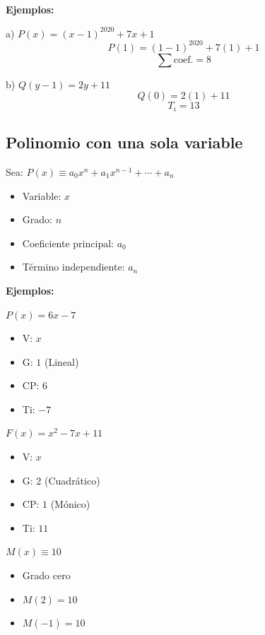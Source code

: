 \documentclass[11pt,a4paper]{article}
\begin{document}
\textbf{Ejemplos:}

\begin{minipage}[t]{0.485\textwidth}
a) $P(x) = (x-1)^{2020} + 7x + 1$
\[P(1) = (1-1)^{2020} + 7(1) + 1\]
\[\textstyle\sum \text{coef.} = 8\]
\end{minipage}\hfill
\begin{minipage}[t]{0.485\textwidth}
b) $Q(y-1) = 2y + 11$
\[Q(0) = 2(1) + 11\]
\[T_i = 13\]
\end{minipage}

\subsection*{Polinomio con una sola variable}
Sea: \quad $P(x) \equiv a_0x^n + a_1x^{n-1} + \cdots + a_n$
\begin{itemize}[label={}]
  \item Variable: $x$
  \item Grado: $n$
  \item Coeficiente principal: $a_0$
  \item Término independiente: $a_n$
\end{itemize}

\textbf{Ejemplos:}

\begin{minipage}[t]{0.320\textwidth}
$P(x) = 6x - 7$
\begin{itemize}[label={}]
  \item V: $x$
  \item G: $1$ (Lineal)
  \item CP: $6$
  \item Ti: $-7$
\end{itemize}
\end{minipage}\hfill
\begin{minipage}[t]{0.359\textwidth}
$F(x) = x^2 - 7x + 11$
\begin{itemize}[label={}]
  \item V: $x$
  \item G: $2$ (Cuadrático)
  \item CP: $1$ (Mónico)
  \item Ti: $11$
\end{itemize}
\end{minipage}\hfill
\begin{minipage}[t]{0.291\textwidth}
$M(x) \equiv 10$
\begin{itemize}[label={}]
  \item Grado cero
  \item $M(2) = 10$
  \item $M(-1) = 10$
\end{itemize}
\end{minipage}
\end{document}
